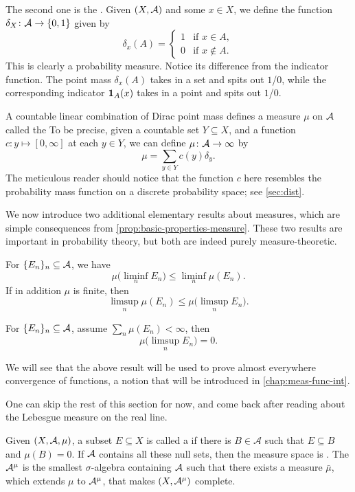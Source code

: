 The second one is the . Given $(X,\mathcal{A})$ and some $x\in X$, we define the function $\delta_X\colon \mathcal{A} \to \{0,1\}$ given by \[
    \delta_x(A) = \begin{cases}
        1 & \text{if } x \in A, \\
        0 & \text{if } x \not\in A.
    \end{cases}
\]
This is clearly a probability measure. Notice its difference from the indicator function. The point mass $\delta_x(A)$ takes in a set and spits out $1$/$0$, while the corresponding indicator $\mathbf{1}_A(x)$ takes in a point and spits out $1$/$0$.

A countable linear combination of Dirac point mass defines a measure $\mu$ on $\mathcal{A}$ called the  To be precise, given a countable set $Y \subseteq X$, and a function $c\colon y \mapsto [0,\infty]$ at each $y \in Y$, we can define $\mu\colon \mathcal{A} \to \infty$ by \[
    \mu = \sum_{y \in Y} c(y)\delta_y.
\] The meticulous reader should notice that the function $c$ here resembles the probability mass function on a discrete probability space; see \cref{sec:dist}.

We now introduce two additional elementary results about measures, which are simple consequences from \cref{prop:basic-properties-measure}. These two results are important in probability theory, but both are indeed purely measure-theoretic.
\begin{cor}
    For $\{E_n\}_n \subseteq \mathcal{A}$, we have \[
        \mu\bigl(\liminf_n E_n\bigr) \leq \liminf_n \mu(E_n).
    \]
    If in addition $\mu$ is finite, then \[
        \limsup_n \mu(E_n) \leq \mu\bigl(\limsup_n E_n\bigr).
    \]
\end{cor}

\begin{namedthm} \label{thm:BorelCantelli-meas-th}
    For $\{E_n\}_n \subseteq \mathcal{A}$, assume $\sum_{n} \mu(E_n) <\infty$, then \[
        \mu\bigl(\limsup_n E_n\bigr) = 0.
    \]
\end{namedthm}

We will see that the above result will be used to prove almost everywhere convergence of functions, a notion that will be introduced in \cref{chap:meas-func-int}.

One can skip the rest of this section for now, and come back after reading about the Lebesgue measure on the real line.

Given $(X,\mathcal{A},\mu)$, a subset $E\subseteq X$ is called a 
if there is $B\in\mathcal{A}$ such that $E\subseteq B$ and $\mu(B)=0$.
If $\mathcal{A}$ contains all these null sets, then the measure space is .
The  $\mathcal{A}^\mu$ is the smallest $\sigma$-algebra containing $\mathcal{A}$ such that there exists a measure $\bar{\mu}$, which extends $\mu$ to $\mathcal{A}^\mu$, that makes $(X,\mathcal{A}^\mu)$ complete.

